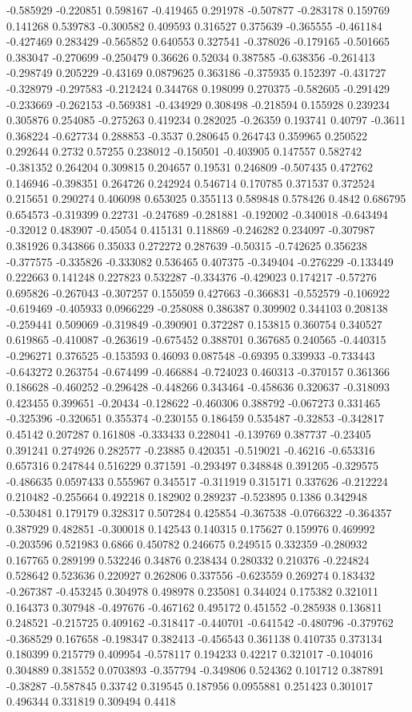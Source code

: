 -0.585929 -0.220851 0.598167 -0.419465 0.291978 -0.507877 -0.283178 0.159769 0.141268 0.539783 -0.300582 0.409593 0.316527 0.375639 -0.365555 -0.461184 -0.427469 0.283429 -0.565852 0.640553 0.327541 -0.378026 -0.179165 -0.501665 0.383047 -0.270699 -0.250479 0.36626 0.52034 0.387585 -0.638356 -0.261413 -0.298749 0.205229 -0.43169 0.0879625 0.363186 -0.375935 0.152397 -0.431727 -0.328979 -0.297583 -0.212424 0.344768 0.198099 0.270375 -0.582605 -0.291429 -0.233669 -0.262153 -0.569381 -0.434929 0.308498 -0.218594 0.155928 0.239234 0.305876 0.254085 -0.275263 0.419234 0.282025 -0.26359 0.193741 0.40797 -0.3611 0.368224 -0.627734 0.288853 -0.3537 0.280645 0.264743 0.359965 0.250522 0.292644 0.2732 0.57255 0.238012 -0.150501 -0.403905 0.147557 0.582742 -0.381352 0.264204 0.309815 0.204657 0.19531 0.246809 -0.507435 0.472762 0.146946 -0.398351 0.264726 0.242924 0.546714 0.170785 0.371537 0.372524 0.215651 0.290274 0.406098 0.653025 0.355113 0.589848 0.578426 0.4842 0.686795 0.654573 -0.319399 0.22731 -0.247689 -0.281881 -0.192002 -0.340018 -0.643494 -0.32012 0.483907 -0.45054 0.415131 0.118869 -0.246282 0.234097 -0.307987 0.381926 0.343866 0.35033 0.272272 0.287639 -0.50315 -0.742625 0.356238 -0.377575 -0.335826 -0.333082 0.536465 0.407375 -0.349404 -0.276229 -0.133449 0.222663 0.141248 0.227823 0.532287 -0.334376 -0.429023 0.174217 -0.57276 0.695826 -0.267043 -0.307257 0.155059 0.427663 -0.366831 -0.552579 -0.106922 -0.619469 -0.405933 0.0966229 -0.258088 0.386387 0.309902 0.344103 0.208138 -0.259441 0.509069 -0.319849 -0.390901 0.372287 0.153815 0.360754 0.340527 0.619865 -0.410087 -0.263619 -0.675452 0.388701 0.367685 0.240565 -0.440315 -0.296271 0.376525 -0.153593 0.46093 0.087548 -0.69395 0.339933 -0.733443 -0.643272 0.263754 -0.674499 -0.466884 -0.724023 0.460313 -0.370157 0.361366 0.186628 -0.460252 -0.296428 -0.448266 0.343464 -0.458636 0.320637 -0.318093 0.423455 0.399651 -0.20434 -0.128622 -0.460306 0.388792 -0.067273 0.331465 -0.325396 -0.320651 0.355374 -0.230155 0.186459 0.535487 -0.32853 -0.342817 0.45142 0.207287 0.161808 -0.333433 0.228041 -0.139769 0.387737 -0.23405 0.391241 0.274926 0.282577 -0.23885 0.420351 -0.519021 -0.46216 -0.653316 0.657316 0.247844 0.516229 0.371591 -0.293497 0.348848 0.391205 -0.329575 -0.486635 0.0597433 0.555967 0.345517 -0.311919 0.315171 0.337626 -0.212224 0.210482 -0.255664 0.492218 0.182902 0.289237 -0.523895 0.1386 0.342948 -0.530481 0.179179 0.328317 0.507284 0.425854 -0.367538 -0.0766322 -0.364357 0.387929 0.482851 -0.300018 0.142543 0.140315 0.175627 0.159976 0.469992 -0.203596 0.521983 0.6866 0.450782 0.246675 0.249515 0.332359 -0.280932 0.167765 0.289199 0.532246 0.34876 0.238434 0.280332 0.210376 -0.224824 0.528642 0.523636 0.220927 0.262806 0.337556 -0.623559 0.269274 0.183432 -0.267387 -0.453245 0.304978 0.498978 0.235081 0.344024 0.175382 0.321011 0.164373 0.307948 -0.497676 -0.467162 0.495172 0.451552 -0.285938 0.136811 0.248521 -0.215725 0.409162 -0.318417 -0.440701 -0.641542 -0.480796 -0.379762 -0.368529 0.167658 -0.198347 0.382413 -0.456543 0.361138 0.410735 0.373134 0.180399 0.215779 0.409954 -0.578117 0.194233 0.42217 0.321017 -0.104016 0.304889 0.381552 0.0703893 -0.357794 -0.349806 0.524362 0.101712 0.387891 -0.38287 -0.587845 0.33742 0.319545 0.187956 0.0955881 0.251423 0.301017 0.496344 0.331819 0.309494 0.4418 